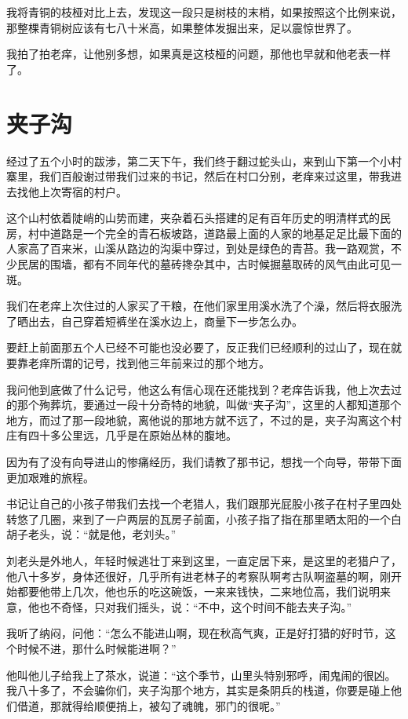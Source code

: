 我将青铜的枝桠对比上去，发现这一段只是树枝的末梢，如果按照这个比例来说，那整棵青铜树应该有七八十米高，如果整体发掘出来，足以震惊世界了。

我拍了拍老痒，让他别多想，如果真是这枝桠的问题，那他也早就和他老表一样了。

\chapter{夹子沟}

经过了五个小时的跋涉，第二天下午，我们终于翻过蛇头山，来到山下第一个小村寨里，我们百般谢过带我们过来的书记，然后在村口分别，老痒来过这里，带我进去找他上次寄宿的村户。

这个山村依着陡峭的山势而建，夹杂着石头搭建的足有百年历史的明清样式的民房，村中道路是一个完全的青石板坡路，道路最上面的人家的地基足足比最下面的人家高了百来米，山溪从路边的沟渠中穿过，到处是绿色的青苔。我一路观赏，不少民居的围墙，都有不同年代的墓砖搀杂其中，古时候掘墓取砖的风气由此可见一斑。

我们在老痒上次住过的人家买了干粮，在他们家里用溪水洗了个澡，然后将衣服洗了晒出去，自己穿着短裤坐在溪水边上，商量下一步怎么办。

要赶上前面那五个人已经不可能也没必要了，反正我们已经顺利的过山了，现在就要靠老痒所谓的记号，找到他三年前来过的那个地方。

我问他到底做了什么记号，他这么有信心现在还能找到？老痒告诉我，他上次去过的那个殉葬坑，要通过一段十分奇特的地貌，叫做“夹子沟”，这里的人都知道那个地方，而过了那一段地貌，离他说的那地方就不远了，不过的是，夹子沟离这个村庄有四十多公里远，几乎是在原始丛林的腹地。

因为有了没有向导进山的惨痛经历，我们请教了那书记，想找一个向导，带带下面更加艰难的旅程。

书记让自己的小孩子带我们去找一个老猎人，我们跟那光屁股小孩子在村子里四处转悠了几圈，来到了一户两层的瓦房子前面，小孩子指了指在那里晒太阳的一个白胡子老头，说：“就是他，老刘头。”

刘老头是外地人，年轻时候逃壮丁来到这里，一直定居下来，是这里的老猎户了，他八十多岁，身体还很好，几乎所有进老林子的考察队啊考古队啊盗墓的啊，刚开始都要他带上几次，他也乐的吃这碗饭，一来来钱快，二来地位高，我们说明来意，他也不奇怪，只对我们摇头，说：“不中，这个时间不能去夹子沟。”

我听了纳闷，问他：“怎么不能进山啊，现在秋高气爽，正是好打猎的好时节，这个时候不进，那什么时候能进啊？”

他叫他儿子给我上了茶水，说道：“这个季节，山里头特别邪呼，闹鬼闹的很凶。我八十多了，不会骗你们，夹子沟那个地方，其实是条阴兵的栈道，你要是碰上他们借道，那就得给顺便捎上，被勾了魂魄，邪门的很呢。”

